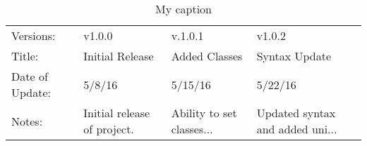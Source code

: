 \begin{table}[]
\centering
\caption{My caption}
\label{my-label}
\begin{tabular}{|l|l|l|l}
\cline{1-1}
Versions:       & v1.0.0                      & v.1.0.1                   & v1.0.2                          \\ \cline{1-1}
Title:          & Initial Release             & Added Classes             & Syntax Update                   \\ \cline{1-1}
Date of Update: & 5/8/16                      & 5/15/16                   & 5/22/16                         \\ \cline{1-1}
Notes:          & Initial release of project. & Ability to set classes... & Updated syntax and added uni... \\ \cline{1-1}
\end{tabular}
\end{table}
